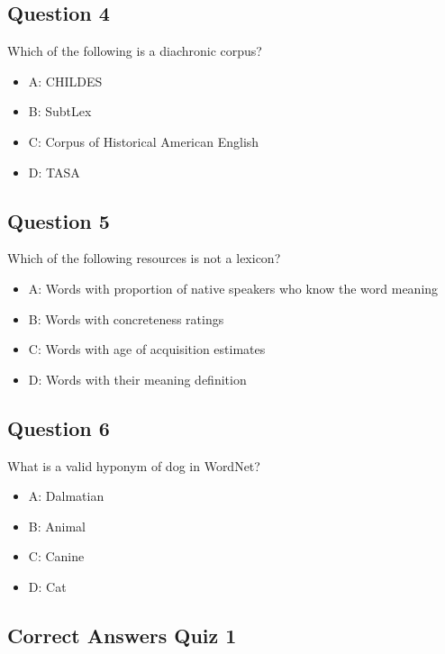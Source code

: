 \documentclass[
  11pt,
  british,
]{article}
\providecommand{\tightlist}{%
  \setlength{\itemsep}{0pt}\setlength{\parskip}{0pt}}
\begin{document}
\hypertarget{question-4}{%
\subsection{Question 4}\label{question-4}}

Which of the following is a diachronic corpus?

\begin{itemize}
\tightlist
\item
  A: CHILDES
\item
  B: SubtLex
\item
  C: Corpus of Historical American English
\item
  D: TASA
\end{itemize}

\hypertarget{question-5}{%
\subsection{Question 5}\label{question-5}}

Which of the following resources is not a lexicon?

\begin{itemize}
\tightlist
\item
  A: Words with proportion of native speakers who know the word meaning
\item
  B: Words with concreteness ratings
\item
  C: Words with age of acquisition estimates
\item
  D: Words with their meaning definition
\end{itemize}

\hypertarget{question-6}{%
\subsection{Question 6}\label{question-6}}

What is a valid hyponym of dog in WordNet?

\begin{itemize}
\tightlist
\item
  A: Dalmatian
\item
  B: Animal
\item
  C: Canine
\item
  D: Cat
\end{itemize}

\hypertarget{correct-answers-quiz-1}{%
\subsection{Correct Answers Quiz 1}\label{correct-answers-quiz-1}}
\end{document}

